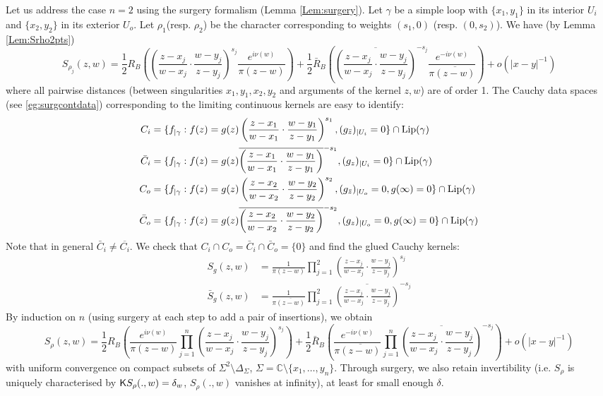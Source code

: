 \documentclass[10pt]{article}
\newcommand{\C}{\mathbb{C}}
\newcommand{\rK}{{\sf K}}
\begin{document}
Let us address the case $n=2$ using the surgery formalism (Lemma \ref{Lem:surgery}). Let $\gamma$ be a simple loop with $\{x_1,y_1\}$ in its interior $U_i$ and $\{x_2,y_2\}$ in its exterior $U_o$. Let $\rho_1$(resp. $\rho_2$) be the character corresponding to weights $(s_1,0)$ (resp. $(0,s_2)$). We have (by Lemma \ref{Lem:Srho2pts})
$$S_{\rho_j}(z,w)=\frac 12R_B\left(\left(\frac{z-x_j}{w-x_j}\cdot\frac{w-y_j}{z-y_j}\right)^{s_j}\frac{e^{i\nu(w)}}{\pi(z-w)}\right)
+\frac 12\bar R_B\left(\overline{\left(\frac{z-x_j}{w-x_j}\cdot\frac{w-y_j}{z-y_j}\right)}^{-{s_j}}\frac{e^{-i\nu(w)}}{\pi\overline{(z-w)}}\right)+o(|x-y|^{-1})$$
where all pairwise distances (between singularities $x_1,y_1,x_2,y_2$ and arguments of the kernel $z,w$) are of order 1. The Cauchy data spaces (see \eqref{eg:surgcontdata}) corresponding to the limiting continuous kernels are easy to identify: 
\begin{align*}
C_i&=\{f_{|\gamma}: f(z)=g(z)\left(\frac{z-x_1}{w-x_1}\cdot\frac{w-y_1}{z-y_1}\right)^{s_1}, (g_{\bar z})_{|U_i}=0\}\cap {\rm Lip}(\gamma)\\
\bar C_i&=\{f_{|\gamma}: f(z)=g(z)\overline{\left(\frac{z-x_1}{w-x_1}\cdot\frac{w-y_1}{z-y_1}\right)}^{-s_1}, (g_{z})_{|U_i}=0\}\cap {\rm Lip}(\gamma)\\
C_o&=\{f_{|\gamma}: f(z)=g(z)\left(\frac{z-x_2}{w-x_2}\cdot\frac{w-y_2}{z-y_2}\right)^{s_2}, (g_{\bar z})_{|U_o}=0, g(\infty)=0\}\cap {\rm Lip}(\gamma)\\
\bar C_o&=\{f_{|\gamma}: f(z)=g(z)\overline{\left(\frac{z-x_2}{w-x_2}\cdot\frac{w-y_2}{z-y_2}\right)}^{-s_2}, (g_{z})_{|U_o}=0, g(\infty)=0\}\cap {\rm Lip}(\gamma)
\end{align*}
Note that in general $\bar C_i\neq \overline{C_i}$. We check that $C_i\cap C_o=\bar C_i\cap \bar C_o=\{0\}$ and find the glued Cauchy kernels:
\begin{align*}
S_g(z,w)&=\frac{1}{\pi(z-w)}\prod_{j=1}^2\left(\frac{z-x_j}{w-x_j}\cdot\frac{w-y_j}{z-y_j}\right)^{s_j}\\
\bar S_g(z,w)&=\frac{1}{\pi\overline{(z-w)}}\prod_{j=1}^2\overline{\left(\frac{z-x_j}{w-x_j}\cdot\frac{w-y_j}{z-y_j}\right)}^{-s_j}
\end{align*}
By induction on $n$ (using surgery at each step to add a pair of insertions), we obtain
\begin{equation}\label{eq:Srhomult}
S_\rho(z,w)=\frac 12R_B\left(\frac{e^{i\nu(w)}}{\pi(z-w)}\prod_{j=1}^n\left(\frac{z-x_j}{w-x_j}\cdot\frac{w-y_j}{z-y_j}\right)^{s_j}\right)
+\frac 12\bar R_B\left(\frac{e^{-i\nu(w)}}{\pi\overline{(z-w)}}\prod_{j=1}^n\overline{\left(\frac{z-x_j}{w-x_j}\cdot\frac{w-y_j}{z-y_j}\right)}^{-{s_j}}\right)+o(|x-y|^{-1})
\end{equation}
with uniform convergence on compact subsets of $\Sigma^2\setminus \Delta_\Sigma$, $\Sigma=\C\setminus\{x_1,\dots,y_n\}$. Through surgery, we also retain invertibility (i.e. $S_\rho$ is uniquely characterised by $\rK S_\rho(.,w)=\delta_w$, $S_\rho(.,w)$ vanishes at infinity), at least for small enough $\delta$.
\end{document}

